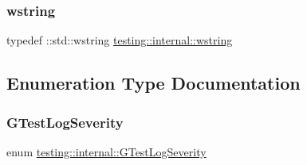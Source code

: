 \mbox{\label{namespacetesting_1_1internal_a3f543179329c353aee1d7b54a9a8e335}} 
\subsubsection{\texorpdfstring{wstring}{wstring}}
{\footnotesize\ttfamily typedef \+::std\+::wstring \mbox{\hyperlink{namespacetesting_1_1internal_a3f543179329c353aee1d7b54a9a8e335}{testing\+::internal\+::wstring}}}



\subsection{Enumeration Type Documentation}
\mbox{\label{namespacetesting_1_1internal_aa6255ef3b023c5b4e1a2198d887fb977}} 
\subsubsection{\texorpdfstring{GTestLogSeverity}{GTestLogSeverity}}
{\footnotesize\ttfamily enum \mbox{\hyperlink{namespacetesting_1_1internal_aa6255ef3b023c5b4e1a2198d887fb977}{testing\+::internal\+::\+G\+Test\+Log\+Severity}}}

